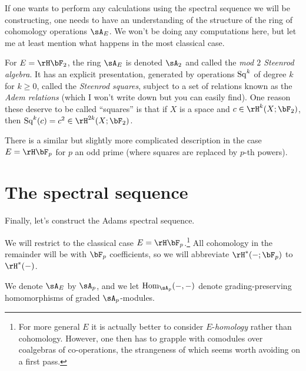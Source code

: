 \begin{example}
  \label{ops-steenrod}
  If one wants to perform any calculations using the spectral sequence we will be constructing, one needs to have an understanding of the structure of the ring of cohomology operations $\sA_E$. We won't be doing any computations here, but let me at least mention what happens in the most classical case.

  For $E = \rH\bF_2$, the ring $\sA_E$ is denoted $\sA_2$ and called the \emph{mod $2$ Steenrod algebra}. It has an explicit presentation, generated by operations $\operatorname{Sq}^k$ of degree $k$ for $k \ge 0$, called the \emph{Steenrod squares}, subject to a set of relations known as the \emph{Adem relations} (which I won't write down but you can easily find). One reason these deserve to be called ``squares'' is that if $X$ is a space and $c \in \rH^k(X;\bF_2)$, then $\Sq^k(c) = c^2 \in \rH^{2k}(X;\bF_2)$.

  There is a similar but slightly more complicated description in the case $E = \HFp$ for $p$ an odd prime (where squares are replaced by $p$-th powers).
\end{example}


\section{The spectral sequence}
\label{ss}

Finally, let's construct the Adams spectral sequence.

\begin{notation}
  \label{ss-restrict}
  We will restrict to the classical case $E = \HFp$.\footnote{For more general $E$ it is actually better to consider $E$-\emph{homology} rather than cohomology. However, one then has to grapple with comodules over coalgebras of co-operations, the strangeness of which seems worth avoiding on a first pass.} All cohomology in the remainder will be with $\bF_p$ coefficients, so we will abbreviate $\rH^*(-;\bF_p)$ to $\rH^*(-)$.

  We denote $\sA_E$ by $\sA_p$, and we let $\Hom_{\sA_p}(-,-)$ denote grading-preserving homomorphisms of graded $\sA_p$-modules.
\end{notation}


